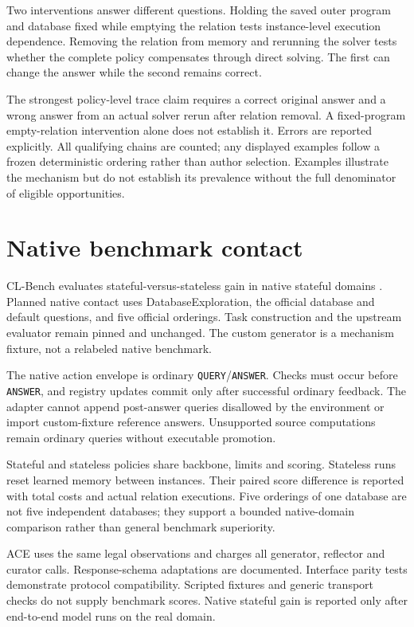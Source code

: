 \documentclass[10pt,twocolumn]{article}
\newcommand{\code}[1]{\texttt{\small #1}}
\begin{document}
Two interventions answer different questions. Holding the saved outer program
and database fixed while emptying the relation tests instance-level execution
dependence. Removing the relation from memory and rerunning the solver tests
whether the complete policy compensates through direct solving. The first can
change the answer while the second remains correct.

The strongest policy-level trace claim requires a correct original answer and
a wrong answer from an actual solver rerun after relation removal. A
fixed-program empty-relation intervention alone does not establish it. Errors
are reported explicitly. All
qualifying chains are counted; any displayed examples follow a frozen
deterministic ordering rather than author selection. Examples illustrate the
mechanism but do not establish its prevalence without the full denominator of
eligible opportunities.

\section{Native benchmark contact}
CL-Bench evaluates stateful-versus-stateless gain in native stateful domains
\citep{asawa2026clbench}. Planned native contact uses DatabaseExploration, the official
database and default questions, and five official orderings. Task construction
and the upstream evaluator remain pinned and unchanged. The custom generator
is a mechanism fixture, not a relabeled native benchmark.

The native action envelope is ordinary \code{QUERY}/\code{ANSWER}. Checks must
occur before \code{ANSWER}, and registry updates commit only after successful
ordinary feedback. The adapter cannot append post-answer queries disallowed by
the environment or import custom-fixture reference answers. Unsupported source
computations remain ordinary queries without executable promotion.

Stateful and stateless policies share backbone, limits and scoring. Stateless
runs reset learned memory between instances. Their paired score difference is
reported with total costs and actual relation executions. Five orderings of
one database are not five independent databases; they support a bounded
native-domain comparison rather than general benchmark superiority.

ACE uses the same legal observations and charges all generator, reflector and
curator calls. Response-schema adaptations are documented. Interface parity
tests demonstrate protocol compatibility. Scripted fixtures and generic
transport checks do not supply benchmark scores. Native stateful gain is
reported only after end-to-end model runs on the real domain.
\end{document}
